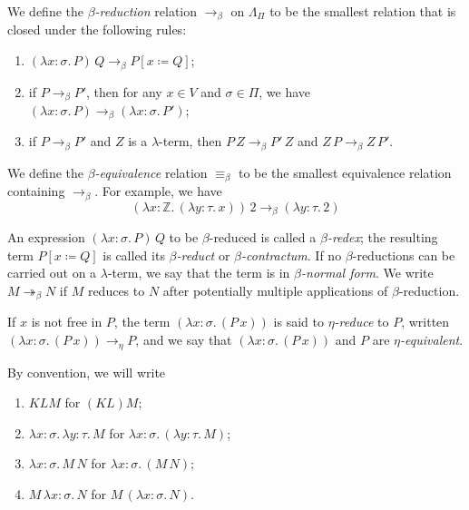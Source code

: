 We define the \emph{\( \beta \)-reduction} relation \( \to_\beta \) on \( \Lambda_\Pi \) to be the smallest relation that is closed under the following rules:
\begin{enumerate}
    \item \( (\lambda x:\sigma.\, P)\, Q \to_\beta P[x \coloneq Q] \);
    \item if \( P \to_\beta P' \), then for any \( x \in V \) and \( \sigma \in \Pi \), we have \( (\lambda x:\sigma.\, P) \to_\beta (\lambda x:\sigma.\, P') \);
    \item if \( P \to_\beta P' \) and \( Z \) is a \( \lambda \)-term, then \( P\,Z \to_\beta P'\,Z \) and \( Z\,P \to_\beta Z\,P' \).
\end{enumerate}
We define the \emph{\( \beta \)-equivalence} relation \( \equiv_\beta \) to be the smallest equivalence relation containing \( \to_\beta \).
For example, we have
\[ (\lambda x:\mathbb Z.\, (\lambda y:\tau.\, x))\, 2 \to_\beta (\lambda y:\tau.\, 2) \]

An expression \( (\lambda x:\sigma.\, P)\, Q \) to be \( \beta \)-reduced is called a \emph{\( \beta \)-redex}; the resulting term \( P[x \coloneq Q] \) is called its \emph{\( \beta \)-reduct} or \emph{\( \beta \)-contractum}.
If no \( \beta \)-reductions can be carried out on a \( \lambda \)-term, we say that the term is in \emph{\( \beta \)-normal form}.
We write \( M \twoheadrightarrow_\beta N \) if \( M \) reduces to \( N \) after potentially multiple applications of \( \beta \)-reduction.

If \( x \) is not free in \( P \), the term \( (\lambda x:\sigma.\, (P\, x)) \) is said to \emph{\( \eta \)-reduce} to \( P \), written \( (\lambda x:\sigma.\, (P\, x)) \to_\eta P \), and we say that \( (\lambda x:\sigma.\, (P\, x)) \) and \( P \) are \emph{\( \eta \)-equivalent}.

By convention, we will write
\begin{enumerate}
    \item \( KLM \) for \( (KL)M \);
    \item \( \lambda x:\sigma.\, \lambda y:\tau.\, M \) for \( \lambda x:\sigma.\, (\lambda y:\tau.\, M) \);
    \item \( \lambda x:\sigma.\, M\, N \) for \( \lambda x:\sigma.\, (M\, N) \);
    \item \( M\, \lambda x:\sigma.\, N \) for \( M\, (\lambda x:\sigma.\, N) \).
\end{enumerate}

